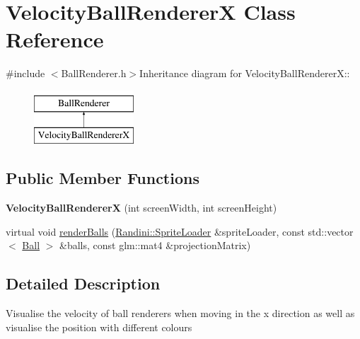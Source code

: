 \hypertarget{classVelocityBallRendererX}{
\section{VelocityBallRendererX Class Reference}
\label{classVelocityBallRendererX}
}


{\ttfamily \#include $<$BallRenderer.h$>$}Inheritance diagram for VelocityBallRendererX::\begin{figure}[H]
\begin{center}
\leavevmode
\includegraphics[height=2cm]{classVelocityBallRendererX}
\end{center}
\end{figure}
\subsection*{Public Member Functions}
\begin{DoxyCompactItemize}
\item 
\hypertarget{classVelocityBallRendererX_ad3ae42e2ab2efab70a9812267eb337a7}{
{\bfseries VelocityBallRendererX} (int screenWidth, int screenHeight)}
\label{classVelocityBallRendererX_ad3ae42e2ab2efab70a9812267eb337a7}

\item 
virtual void \hyperlink{classVelocityBallRendererX_ad0ef24ce7ba5116231f4a47aff280f12}{renderBalls} (\hyperlink{classRandini_1_1SpriteLoader}{Randini::SpriteLoader} \&spriteLoader, const std::vector$<$ \hyperlink{structBall}{Ball} $>$ \&balls, const glm::mat4 \&projectionMatrix)
\end{DoxyCompactItemize}


\subsection{Detailed Description}
Visualise the velocity of ball renderers when moving in the x direction as well as visualise the position with different colours 

